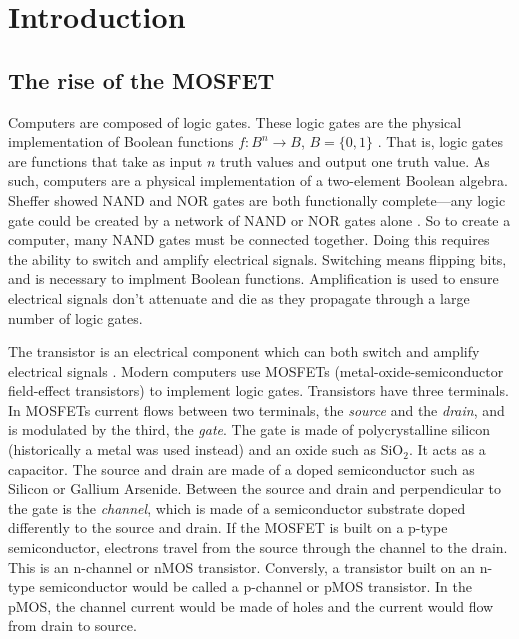 \message{ !name(report.tex)}\documentclass[]{article}
\begin{document}
\tableofcontents
\newpage
\section{Introduction}
\subsection{The rise of the MOSFET}
Computers are composed of logic gates. These logic gates are the physical implementation of Boolean functions $f:B^n \rightarrow B$, $B=\{0,1\}$ \cite{elements}. That is, logic gates are functions that take as input $n$ truth values and output one truth value. As such, computers are a physical implementation of a two-element Boolean algebra. Sheffer showed NAND and NOR gates are both functionally complete---any logic gate could be created by a network of NAND or NOR gates alone \cite{elements}. So to create a computer, many NAND gates must be connected together. Doing this requires the ability to switch and amplify electrical signals. Switching means flipping bits, and is necessary to implment Boolean functions. Amplification is used to ensure electrical signals don't attenuate and die as they propagate through a large number of logic gates. 

The transistor is an electrical component which can both switch and amplify electrical signals \cite{Guide to state-of-the-art electron devices}. Modern computers use MOSFETs (metal-oxide-semiconductor field-effect transistors) to implement logic gates. Transistors have three terminals. In MOSFETs current flows between two terminals, the \emph{source} and the \emph{drain}, and is modulated by the third, the \emph{gate}. The gate is made of polycrystalline silicon (historically a metal was used instead) and an oxide such as SiO$_2$. It acts as a capacitor. The source and drain are made of a doped semiconductor such as Silicon or Gallium Arsenide. Between the source and drain and perpendicular to the gate is the \emph{channel}, which is made of a semiconductor substrate doped differently to the source and drain. If the MOSFET is built on a p-type semiconductor, electrons travel from the source through the channel to the drain. This is an n-channel or nMOS transistor. Conversly, a transistor built on an n-type semiconductor would be called a p-channel or pMOS transistor. In the pMOS, the channel current would be made of holes and the current would flow from drain to source.
\end{document}
